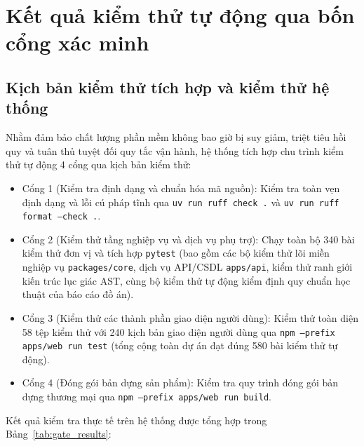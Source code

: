 \section{Kết quả kiểm thử tự động qua bốn cổng xác minh}
\label{sec:kiem_thu_tu_dong}

\subsection{Kịch bản kiểm thử tích hợp và kiểm thử hệ thống}
\label{subsec:kiem_thu_4_gate}

Nhằm đảm bảo chất lượng phần mềm không bao giờ bị suy giảm, triệt tiêu hồi quy và tuân thủ tuyệt đối quy tắc vận hành, hệ thống tích hợp chu trình kiểm thử tự động 4 cổng qua kịch bản kiểm thử:
\begin{itemize}
    \item Cổng 1 (Kiểm tra định dạng và chuẩn hóa mã nguồn): Kiểm tra toàn vẹn định dạng và lỗi cú pháp tĩnh qua \texttt{uv run ruff check .} và \texttt{uv run ruff format --check .}.
    \item Cổng 2 (Kiểm thử tầng nghiệp vụ và dịch vụ phụ trợ): Chạy toàn bộ 340 bài kiểm thử đơn vị và tích hợp \texttt{pytest} (bao gồm các bộ kiểm thử lõi miền nghiệp vụ \texttt{packages/}\allowbreak\texttt{core}, dịch vụ API/CSDL \texttt{apps/}\allowbreak\texttt{api}, kiểm thử ranh giới kiến trúc lục giác AST, cùng bộ kiểm thử tự động kiểm định quy chuẩn học thuật của báo cáo đồ án).
    \item Cổng 3 (Kiểm thử các thành phần giao diện người dùng): Kiểm thử toàn diện 58 tệp kiểm thử với 240 kịch bản giao diện người dùng qua \texttt{npm --prefix apps/web run test} (tổng cộng toàn dự án đạt đúng 580 bài kiểm thử tự động).
    \item Cổng 4 (Đóng gói bản dựng sản phẩm): Kiểm tra quy trình đóng gói bản dựng thương mại qua \texttt{npm --prefix apps/web run build}.
\end{itemize}

Kết quả kiểm tra thực tế trên hệ thống được tổng hợp trong Bảng~\ref{tab:gate_results}:

